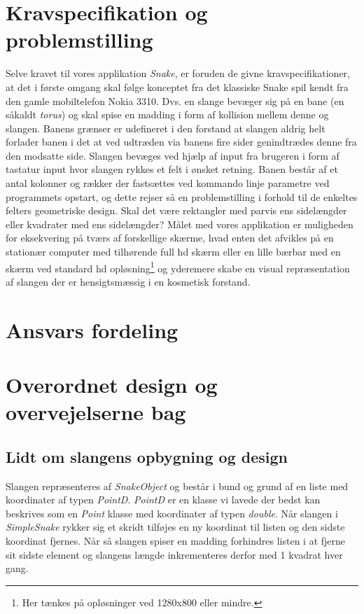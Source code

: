 \documentclass[]{article}
\begin{document}
\section{Kravspecifikation og problemstilling}

Selve kravet til  vores applikation \textit{Snake}, er foruden de givne kravspecifikationer, at det i første omgang skal følge konceptet fra det klassiske Snake spil kendt fra den gamle mobiltelefon Nokia 3310. Dvs. en slange bevæger sig på en bane (en såkaldt \textit{torus}) og skal spise en madding i form af kollision mellem denne og slangen. Banens grænser er udefineret i den forstand at slangen aldrig helt forlader banen i det at ved udtræden via banens fire sider genindtrædes denne fra den modsatte side. Slangen bevæges ved hjælp af input fra brugeren i form af tastatur input hvor slangen rykkes et felt i ønsket retning. Banen består af et antal kolonner og rækker der fastsættes ved kommando linje parametre ved programmets opstart, og dette rejser så en problemstilling i forhold til de enkeltes felters geometriske design. Skal det være rektangler med parvis ens sidelængder eller kvadrater med ens sidelængder? Målet med vores applikation er muligheden for eksekvering på tværs af forskellige skærme, hvad enten det afvikles på en stationær computer med tilhørende full hd skærm eller en lille bærbar med en skærm ved standard hd opløsning\footnote{Her tænkes på opløsninger ved 1280x800 eller mindre.} og yderemere skabe en visual repræsentation af slangen der er hensigtsmæssig i en kosmetisk forstand. 

\section{Ansvars fordeling}

\section{Overordnet design og overvejelserne bag}

\subsection{Lidt om slangens opbygning og design}

Slangen repræsenteres af \textit{SnakeObject} og består i bund og grund af en liste med koordinater af typen \textit{PointD}. \textit{PointD} er en klasse vi lavede der bedst kan beskrives som en \textit{Point} klasse med koordinater af typen \textit{double}. Når slangen i \textit{SimpleSnake} rykker sig et skridt tilføjes en ny koordinat til listen og den sidste koordinat fjernes. Når så slangen spiser en madding forhindres listen i at fjerne sit sidste element og slangens længde inkrementeres derfor med 1 kvadrat hver gang.
\end{document}
